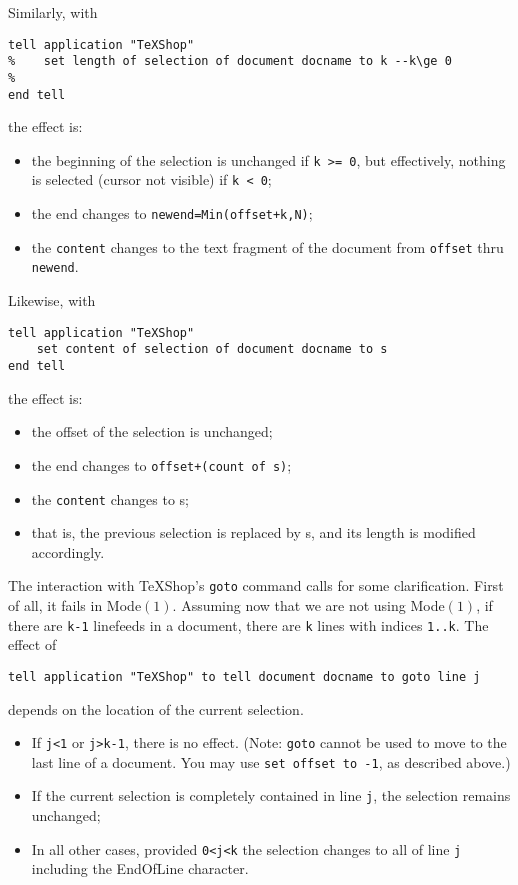 \documentclass[11pt]{amsart}
\begin{document}
Similarly, with
\begin{verbatim}
tell application "TeXShop"
%    set length of selection of document docname to k --k\ge 0
%
end tell
\end{verbatim}
the effect is:
\begin{itemize}
\item
the beginning of the selection is unchanged if \verb|k >= 0|, but effectively, nothing is selected (cursor not visible) if \verb|k < 0|;
\item the end  changes to {\tt newend=Min(offset+k,N)};
\item  the {\tt content} changes to the text fragment of the document from {\tt offset} thru {\tt newend}.
\end{itemize}
Likewise, with
\begin{verbatim}
tell application "TeXShop"
    set content of selection of document docname to s
end tell
\end{verbatim}
the effect is:
\begin{itemize}
\item
the offset of the selection is unchanged;
\item the end  changes to {\tt offset+(count of s)};
\item  the {\tt content} changes to s;
\item that is, the previous selection is replaced by s, and its length is modified accordingly.
\end{itemize}
The interaction with TeXShop's {\tt goto} command calls for some clarification.
First of all, it fails in Mode$(1)$. Assuming now that we are not using Mode$(1)$, if there are {\tt k-1} linefeeds in a document, there are {\tt k} lines with indices {\tt 1..k}. The effect of 
\begin{verbatim}
tell application "TeXShop" to tell document docname to goto line j
\end{verbatim}
depends on the location of the current selection.
\begin{itemize}
\item If {\tt j<1} or {\tt j>k-1}, there is no effect. (Note: {\tt goto} cannot be used to move to the last line of a document. You may use {\tt set offset to -1}, as described above.)
\item
If the current selection is completely contained in line {\tt j}, the selection remains unchanged;
\item In all other cases, provided {\tt 0<j<k} the selection changes to all of line {\tt j} including the EndOfLine character.
\end{itemize}
\end{document}
